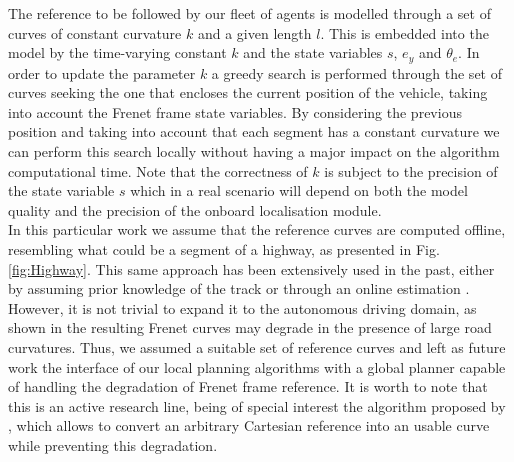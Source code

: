 \documentclass[a4paper,fleqn]{cas-sc}
\begin{document}
The reference to be followed by our fleet of agents is modelled through a set of curves of constant curvature $k$ and a given length $l$. This is embedded into the model by the time-varying constant $k$ and the state variables $s$, $e_{y}$ and $\theta_{e}$. In order to update the parameter $k$ a greedy search is performed through the set of curves seeking the one that encloses the current position of the vehicle, taking into account the Frenet frame state variables. By considering the previous position and taking into account that each segment has a constant curvature we can perform this search locally without having a major impact on the algorithm computational time. Note that the correctness of $k$ is subject to the precision of the state variable $s$ which in a real scenario will depend on both the model quality and the precision of the onboard localisation module.\\

In this particular work we assume that the reference curves are computed offline, resembling what could be a segment of a highway, as presented in Fig. \ref{fig:Highway}. This same approach has been extensively used in the past, either by assuming prior knowledge of the track \cite{alcala2020lpv} or through an online estimation \cite{Kabzan2019}. However, it is not trivial to expand it to the autonomous driving domain, as shown in \cite{li2020fast} the resulting Frenet curves may degrade in the presence of large road curvatures. Thus, we assumed a suitable set of reference curves and left as future work the interface of our local planning algorithms with a global planner capable of handling the degradation of Frenet frame reference. It is worth to note that this is an active research line, being of special interest the algorithm proposed by \cite{Sun2020}, which allows to convert an arbitrary Cartesian reference into an usable curve while preventing this degradation. 
\end{document}
